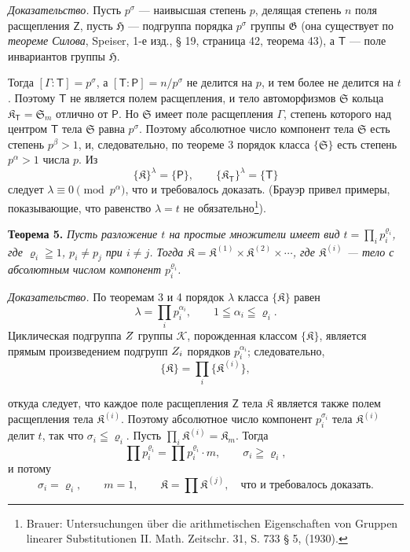 \documentclass[11pt]{article}
\newcommand{\srcfn}[2]{\footnote{#2}}
\begin{document}
\emph{Доказательство.} Пусть \(p^\sigma\) --- наивысшая степень \(p\), делящая степень \(n\) поля расщепления \(\mathsf{Z}\), пусть \(\mathfrak H\) --- подгруппа порядка \(p^\sigma\) группы \(\mathfrak G\) (она существует по \emph{теореме Силова}, Speiser, 1-е изд., § 19, страница 42, теорема 43), а \(\mathsf{T}\) --- поле инвариантов группы \(\mathfrak H\).

Тогда \([\Gamma:\mathsf{T}]=p^\sigma\), а \([\mathsf{T}:\mathsf P]=n/p^\sigma\) не делится на \(p\), и тем более не делится на \(t\). Поэтому \(\mathsf{T}\) не является полем расщепления, и тело автоморфизмов \(\mathfrak S\) кольца \(\mathfrak K_{\mathsf{T}}=\mathfrak S_m\) отлично от \(\mathsf P\). Но \(\mathfrak S\) имеет поле расщепления \(\Gamma\), степень которого над центром \(\mathsf{T}\) тела \(\mathfrak S\) равна \(p^\sigma\). Поэтому абсолютное число компонент тела \(\mathfrak S\) есть степень \(p^\beta>1\), и, следовательно, по теореме 3 порядок класса \(\{\mathfrak S\}\) есть степень \(p^\alpha>1\) числа \(p\). Из
\[
\{\mathfrak K\}^{\lambda}=\{\mathsf P\},
\qquad
\{\mathfrak K_{\mathsf{T}}\}^{\lambda}=\{\mathsf{T}\}
\]
следует \(\lambda\equiv0\pmod {p^\alpha}\), что и требовалось доказать. (Брауэр привел примеры, показывающие, что равенство \(\lambda=t\) не обязательно\srcfn{1}{Brauer: Untersuchungen über die arithmetischen Eigenschaften von Gruppen linearer Substitutionen II. Math. Zeitschr. 31, S. 733 § 5, (1930).}).

\textbf{Теорема 5.} \emph{Пусть разложение \(t\) на простые множители имеет вид \(t=\prod_i p_i^{\varrho_i}\), где \(\varrho_i\geqq1\), \(p_i\ne p_j\) при \(i\ne j\). Тогда \(\mathfrak K=\mathfrak K^{(1)}\times\mathfrak K^{(2)}\times\cdots\), где \(\mathfrak K^{(i)}\) --- тело с абсолютным числом компонент \(p_i^{\varrho_i}\).}

\emph{Доказательство.} По теоремам 3 и 4 порядок \(\lambda\) класса \(\{\mathfrak K\}\) равен
\[
\lambda=\prod_i p_i^{\alpha_i},\qquad 1\leqq\alpha_i\leqq\varrho_i.
\]
Циклическая подгруппа \(\mathscr \mathsf{Z}\) группы \(\mathscr K\), порожденная классом \(\{\mathfrak K\}\), является прямым произведением подгрупп \(\mathscr \mathsf{Z}_i\) порядков \(p_i^{\alpha_i}\); следовательно,
\[
\{\mathfrak K\}=\prod_i\{\mathfrak K^{(i)}\},
\]

откуда следует, что каждое поле расщепления \(\mathsf{Z}\) тела \(\mathfrak K\) является также полем расщепления тела \(\mathfrak K^{(i)}\). Поэтому абсолютное число компонент \(p_i^{\sigma_i}\) тела \(\mathfrak K^{(i)}\) делит \(t\), так что \(\sigma_i\leqq\varrho_i\). Пусть \(\prod_i \mathfrak K^{(i)}=\mathfrak K_m\). Тогда
\[
\prod p_i^{\varrho_i}=\prod p_i^{\varrho_i}\cdot m,
\qquad
\sigma_i\geqq\varrho_i,
\]
и потому
\[
\sigma_i=\varrho_i,\qquad m=1,\qquad
\mathfrak K=\prod \mathfrak K^{(j)},
\quad\text{что и требовалось доказать.}
\]
\end{document}
